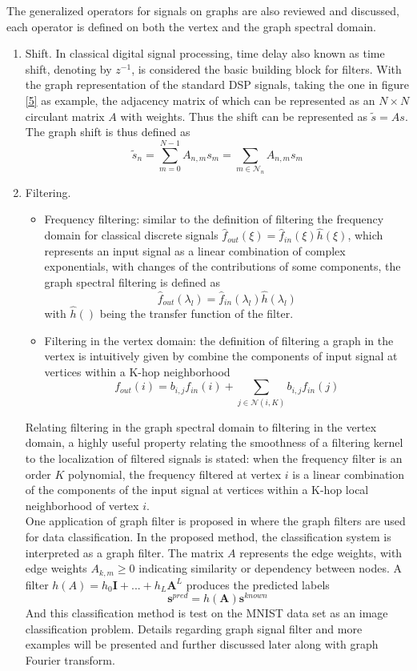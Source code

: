 \documentclass[conference]{IEEEtran}
\begin{document}
The generalized operators for signals on graphs are also reviewed and discussed, each operator is defined on both the vertex and the graph spectral domain. 
\begin{enumerate}
\item Shift. In classical digital signal processing, time delay also known as time shift, denoting by $z^{-1}$, is considered the basic building block for filters. With the graph representation of the standard DSP signals, taking the one in figure \ref{5} as example, the adjacency matrix of which can be represented as an $N\times N$ circulant  matrix $A$ with weights. Thus the shift can be represented as $\tilde{s} = As$. The graph shift is thus defined as 
$$\tilde{s}_n = \sum_{m=0}^{N-1}A_{n,m}s_m=\sum_{m\in\mathcal{N}_n}A_{n,m}s_m$$
\item Filtering. 
\begin{itemize}
\item Frequency filtering: similar to the definition of filtering the frequency domain for classical discrete signals $\hat{f}_{out}(\xi)=\hat{f}_{in}(\xi)\hat{h}(\xi)$, which represents an input signal as a linear combination of complex exponentials, with changes of the contributions of some components, the graph spectral filtering is defined as
$$\hat{f}_{out}(\lambda_l)=\hat{f}_{in}(\lambda_l)\hat{h}(\lambda_l)$$
with $\hat{h}()$ being the transfer function of the filter.

\item Filtering in the vertex domain: the definition of filtering a graph in the vertex is intuitively given by combine the components of input signal at vertices within a K-hop neighborhood
$$f_{out}(i)=b_{i,j}f_{in}(i)+\sum_{j\in\mathcal{N}(i,K)}b_{i,j}f_{in}(j)$$
\end{itemize}
Relating filtering in the graph spectral domain to filtering in the vertex domain, a highly useful property relating the smoothness of a filtering kernel to the localization of filtered signals is stated: when the frequency filter is an order $K$ polynomial, the frequency filtered at vertex $i$ is a linear combination of the components of the input signal at vertices within a K-hop local neighborhood of vertex $i$. \\
One application of graph filter is proposed in \cite{sandryhaila2013discrete3} where the graph filters are used for data classification. In the proposed method, the classification system is interpreted as a graph filter. The matrix $A$ represents the edge weights, with  edge weights $A_{k,m}\geq 0$ indicating similarity or dependency between nodes. A filter $h(A) = h_0\mathbf{I}+...+h_L\mathbf{A}^L$ produces the predicted labels
$$\mathbf{s}^{pred}=h(\mathbf{A})\mathbf{s}^{known}$$
And this classification method is test on the MNIST data set as an image classification problem. Details regarding graph signal filter and more examples will be presented and further discussed later along with graph Fourier transform.


\end{enumerate}
\end{document}
